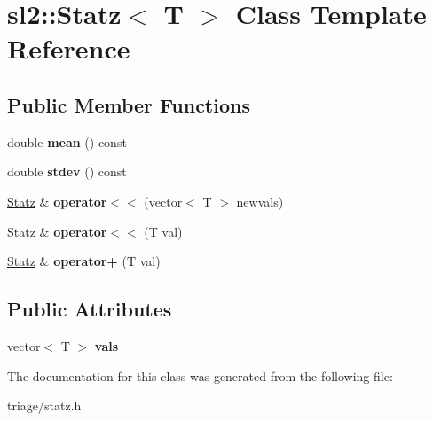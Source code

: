 \hypertarget{classsl2_1_1_statz}{}\section{sl2\+:\+:Statz$<$ T $>$ Class Template Reference}
\label{classsl2_1_1_statz}
\subsection*{Public Member Functions}
\begin{DoxyCompactItemize}
\item 
\mbox{\label{classsl2_1_1_statz_a2bc358c84c9ed7887b129fefd92549f4}} 
double {\bfseries mean} () const
\item 
\mbox{\label{classsl2_1_1_statz_a80c5dd91f114a4b149b0afd14fb6382f}} 
double {\bfseries stdev} () const
\item 
\mbox{\label{classsl2_1_1_statz_afc85bfa9898653f7a60e113d46cc294d}} 
\mbox{\hyperlink{classsl2_1_1_statz}{Statz}} \& {\bfseries operator$<$$<$} (vector$<$ T $>$ newvals)
\item 
\mbox{\label{classsl2_1_1_statz_a84b02133a7c5548ce963cd98ee786ba4}} 
\mbox{\hyperlink{classsl2_1_1_statz}{Statz}} \& {\bfseries operator$<$$<$} (T val)
\item 
\mbox{\label{classsl2_1_1_statz_a633208512bcc7b54f94aed4665fd6b7d}} 
\mbox{\hyperlink{classsl2_1_1_statz}{Statz}} \& {\bfseries operator+} (T val)
\end{DoxyCompactItemize}
\subsection*{Public Attributes}
\begin{DoxyCompactItemize}
\item 
\mbox{\label{classsl2_1_1_statz_a33d17a8d3e93fcf6d925b3d2e9c62796}} 
vector$<$ T $>$ {\bfseries vals}
\end{DoxyCompactItemize}


The documentation for this class was generated from the following file\+:\begin{DoxyCompactItemize}
\item 
triage/statz.\+h\end{DoxyCompactItemize}
